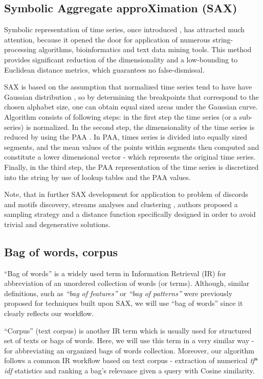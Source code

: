 \documentclass{llncs}
\begin{document}
\subsection{Symbolic Aggregate approXimation (SAX)}
Symbolic representation of time series, once introduced \cite{sax}, has attracted much attention,
because it opened the door for application of numerous string-processing algorithms, bioinformatics
and text data mining tools. This method provides significant reduction of the dimensionality and
a low-bounding to Euclidean distance metrics, which guarantees no false-dismissal.

SAX is based on the assumption that normalized time series tend to have have Gaussian distribution
\cite{larsen_marx}, so by determining the breakpoints that correspond to the chosen alphabet
size, one can obtain equal sized areas under the Gaussian curve. Algorithm consists of following
steps: in the first step the time series (or a sub-series) is normalized. In the second step, the
dimensionality of the time series is reduced by using the PAA \cite{paa}. In PAA, times series is
divided into equally sized segments, and the mean values of the points within segments then computed
and constitute a lower dimensional vector - which represents the original time series. Finally, in
the third step, the PAA representation of the time series is discretized into the string by use of
lookup tables and the PAA values.

Note, that in further SAX development \cite{hot_sax}for application to problem of discords
and motifs discovery, streams analyses and clustering \cite{streaming_sax}, authors
proposed a sampling strategy and a distance function specifically designed in order to avoid trivial
and degenerative solutions. 

\subsection{Bag of words, corpus}
``Bag of words'' is a widely used term in Information Retrieval (IR) for abbreviation of an
unordered collection of words (or terms). Although, similar definitions, such as \textit{``bag of
features''} \cite{bag_features} or \textit{``bag of patterns''} \cite{bag_patterns} were previously
proposed for techniques built upon SAX, we will use ``bag of words'' since it clearly reflects our
workflow. 

``Corpus'' (text corpus) is another IR term which is usually used for structured set of texts or
bags of words. Here, we will use this term in a very similar way - for abbreviating an organized
bags of words collection. Moreover, our algorithm follows a common IR workflow based on text corpus
- extraction of numerical \textit{tf$\ast$idf} statistics and ranking a bag's relevance given a
query with Cosine similarity.
\end{document}
